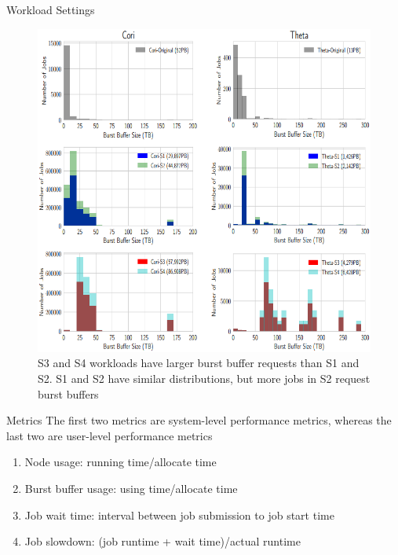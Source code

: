 \documentclass[aspectratio=1610]{beamer}
\begin{document}
\begin{frame}{Workload Settings}
\begin{figure}
    \centering
    \includegraphics[scale=0.40]{pic/workload_reset.png}
    \caption{S3 and S4 workloads have larger burst buffer requests than S1 and S2. S1 and S2 have similar distributions, but more jobs in S2 request burst
    buffers}
    \label{fig:my_label}
\end{figure}    
\end{frame}

\begin{frame}{Metrics}
The first two metrics are system-level performance metrics, whereas the last two are user-level performance metrics
\begin{enumerate}
    \item Node usage: running time/allocate time
    \item Burst buffer usage: using time/allocate time
    \item Job wait time: interval between job submission to job start time
    \item Job slowdown: (job runtime + wait time)/actual runtime
\end{enumerate}
\end{frame}
\end{document}
